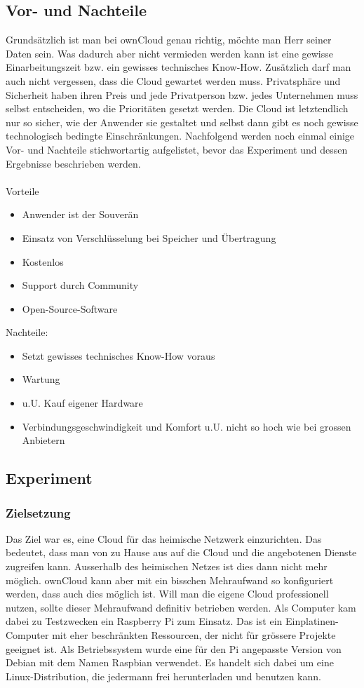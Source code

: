 \subsection{Vor- und Nachteile}
Grundsätzlich ist man bei ownCloud genau richtig, möchte man Herr seiner Daten sein. Was dadurch aber nicht vermieden werden kann ist eine gewisse Einarbeitungszeit bzw. ein gewisses technisches Know-How. Zusätzlich darf man auch nicht vergessen, dass die Cloud gewartet werden muss. Privatsphäre und Sicherheit haben ihren Preis und jede Privatperson bzw. jedes Unternehmen muss selbst entscheiden, wo die Prioritäten gesetzt werden. Die Cloud ist letztendlich nur so sicher, wie der Anwender sie gestaltet und selbst dann gibt es noch gewisse technologisch bedingte Einschränkungen.
Nachfolgend werden noch einmal einige Vor- und Nachteile stichwortartig aufgelistet, bevor das Experiment und dessen Ergebnisse beschrieben werden.
\\
\\
Vorteile
\begin{itemize}
\item Anwender ist der Souverän
\item Einsatz von Verschlüsselung bei Speicher und Übertragung
\item Kostenlos
\item Support durch Community
\item Open-Source-Software
\end{itemize}

Nachteile:
\begin{itemize}
\item Setzt gewisses technisches Know-How voraus
\item Wartung
\item u.U. Kauf eigener Hardware
\item Verbindungsgeschwindigkeit und Komfort u.U. nicht so hoch wie bei grossen Anbietern
\end{itemize}

\subsection{Experiment}

\subsubsection{Zielsetzung}
Das Ziel war es, eine Cloud für das heimische Netzwerk einzurichten. Das bedeutet, dass man von zu Hause aus auf die Cloud und die angebotenen Dienste zugreifen kann. Ausserhalb des heimischen Netzes ist dies dann nicht mehr möglich. ownCloud kann aber mit ein bisschen Mehraufwand so konfiguriert werden, dass auch dies möglich ist. Will man die eigene Cloud professionell nutzen, sollte dieser Mehraufwand definitiv betrieben werden. Als Computer kam dabei zu Testzwecken ein Raspberry Pi zum Einsatz. Das ist ein Einplatinen-Computer mit eher beschränkten Ressourcen, der nicht für grössere Projekte geeignet ist. Als Betriebssystem wurde eine für den Pi angepasste Version von Debian mit dem Namen Raspbian verwendet. Es handelt sich dabei um eine Linux-Distribution, die jedermann frei herunterladen und benutzen kann.

